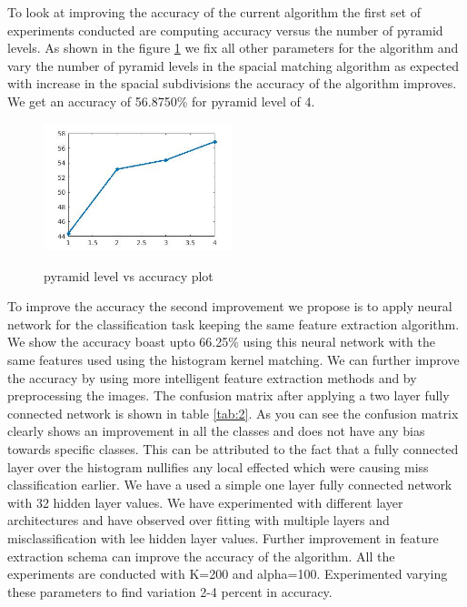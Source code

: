 \documentclass[12pt]{article}
\newenvironment{problem}[2][Problem]{\begin{trivlist}
\item[\hskip \labelsep {\bfseries #1}\hskip \labelsep {\bfseries #2.}]}{\end{trivlist}}
\begin{document}
\begin{problem}{2.7}
To look at improving the accuracy of the current algorithm the first set of experiments conducted are computing accuracy versus the number of pyramid levels. As shown in the figure \ref{fig:acc} we fix all other parameters for the algorithm and vary the number of pyramid levels in the spacial matching algorithm as expected with increase in the spacial subdivisions the accuracy of the algorithm improves. We get an accuracy of 56.8750\% for pyramid level of 4.

\begin{figure}[t]
\begin{center}
	\includegraphics[width=55mm]{images/check}\\
\end{center}
\caption{pyramid level vs accuracy plot}
\label{fig:acc}

\end{figure}

To improve the accuracy the second improvement we propose is to apply neural network for the classification task keeping the same feature extraction algorithm. We show the accuracy boast upto 66.25\% using this neural network with the same features used using the histogram kernel matching. We can further improve the accuracy by using more intelligent feature extraction methods and by preprocessing the images. The confusion matrix after applying a two layer fully connected network is shown in table \ref{tab:2}. As you can see the confusion matrix clearly shows an improvement in all the classes and does not have any bias towards specific classes. This can be attributed to the fact that a fully connected layer over the histogram nullifies any local effected which were causing miss classification earlier. We have a used a simple one layer fully connected network with 32 hidden layer values. We have experimented with different layer architectures and have observed over fitting with multiple layers and misclassification with lee hidden layer values. Further improvement in feature extraction schema can improve the accuracy of the algorithm. All the experiments are conducted with K=200 and alpha=100. Experimented varying these parameters to find variation 2-4 percent in accuracy. 


\end{problem}
\end{document}
